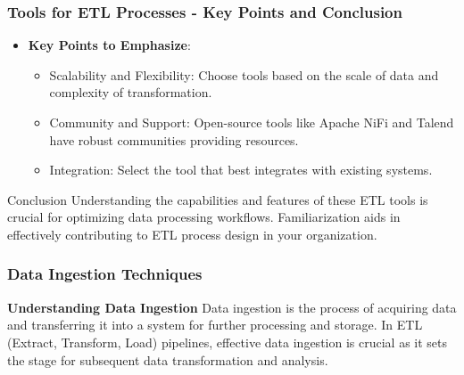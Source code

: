 \documentclass{beamer}
\begin{document}
\begin{frame}[fragile]
    \frametitle{Tools for ETL Processes - Key Points and Conclusion}
    \begin{itemize}
        \item \textbf{Key Points to Emphasize}:
        \begin{itemize}
            \item Scalability and Flexibility: Choose tools based on the scale of data and complexity of transformation.
            \item Community and Support: Open-source tools like Apache NiFi and Talend have robust communities providing resources.
            \item Integration: Select the tool that best integrates with existing systems.
        \end{itemize}
    \end{itemize}
    
    \begin{block}{Conclusion}
        Understanding the capabilities and features of these ETL tools is crucial for optimizing data processing workflows. Familiarization aids in effectively contributing to ETL process design in your organization.
    \end{block}
\end{frame}

\begin{frame}
    \frametitle{Data Ingestion Techniques}
    \textbf{Understanding Data Ingestion} \newline
    Data ingestion is the process of acquiring data and transferring it into a system for further processing and storage. In ETL (Extract, Transform, Load) pipelines, effective data ingestion is crucial as it sets the stage for subsequent data transformation and analysis.
\end{frame}
\end{document}

